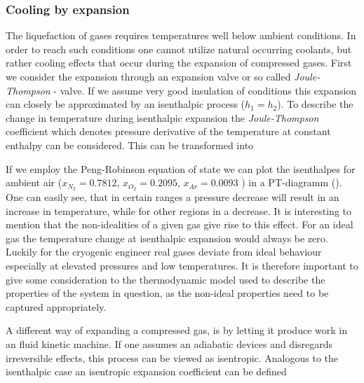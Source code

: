     \subsubsection{Cooling by expansion}
        The liquefaction of gases requires temperatures well below ambient conditions. In order to reach
        such conditions one cannot utilize natural occurring coolants, but rather cooling effects that occur
        during the expansion of compressed gases. First we consider the expansion through an expansion valve
        or so called \emph{Joule-Thompson} - valve. If we assume very good insulation of  conditions this
        expansion can closely be approximated by an isenthalpic process ($h_1 = h_2$). To describe the change
        in temperature during isenthalpic expansion the \emph{Joule-Thompson} coefficient
        which denotes pressure derivative of the temperature at constant enthalpy can be considered.
        This can be transformed into


        If we employ the Peng-Robinson equation of state we can plot the isenthalpes for ambient air
        ($x_{N_2}=0.7812$, $x_{O_2}=0.2095$, $x_{Ar}=0.0093$ ) in a PT-diagramm ().
        One can easily see, that in certain ranges a pressure decrease will result in an increase in temperature,
        while for other regions in a decrease. It is interesting to mention that the non-idealities
        of a given gas give rise to this effect. For an ideal gas the temperature change at isenthalpic
        expansion would always be zero. Luckily for the cryogenic engineer real gases deviate from ideal
        behaviour especially at elevated pressures and low temperatures. It is therefore important to give some
        consideration to the thermodynamic model used to describe the properties of the system in question, as the
        non-ideal properties need to be captured appropriately.

        A different way of expanding a compressed gas, is by letting it produce work in an fluid kinetic machine.
        If one assumes an adiabatic devices and disregards irreversible effects, this process can be viewed as
        isentropic. Analogous to the isenthalpic case an isentropic expansion coefficient can be defined

